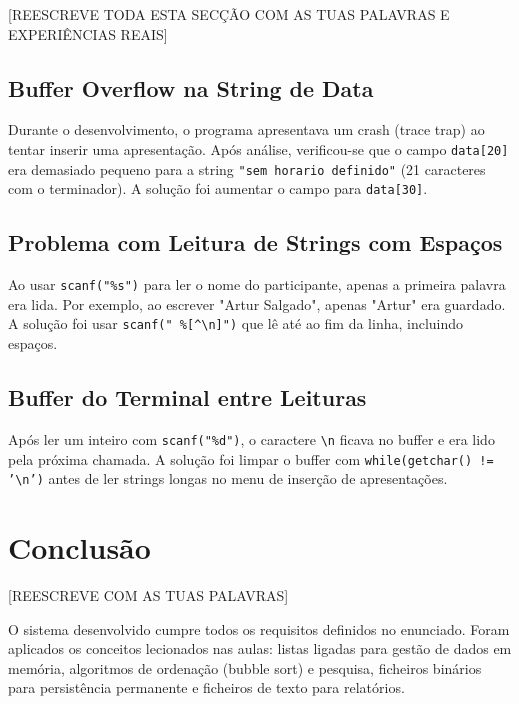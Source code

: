 \documentclass[12pt,a4paper]{article}
\begin{document}
[REESCREVE TODA ESTA SECÇÃO COM AS TUAS PALAVRAS E EXPERIÊNCIAS REAIS]

\subsection{Buffer Overflow na String de Data}

Durante o desenvolvimento, o programa apresentava um crash (trace trap) ao tentar inserir uma apresentação. Após análise, verificou-se que o campo \texttt{data[20]} era demasiado pequeno para a string \texttt{"sem horario definido"} (21 caracteres com o terminador). A solução foi aumentar o campo para \texttt{data[30]}.

\subsection{Problema com Leitura de Strings com Espaços}

Ao usar \texttt{scanf("\%s")} para ler o nome do participante, apenas a primeira palavra era lida. Por exemplo, ao escrever "Artur Salgado", apenas "Artur" era guardado. A solução foi usar \texttt{scanf(" \%[{\textasciicircum}\textbackslash n]")} que lê até ao fim da linha, incluindo espaços.

\subsection{Buffer do Terminal entre Leituras}

Após ler um inteiro com \texttt{scanf("\%d")}, o caractere \texttt{\textbackslash n} ficava no buffer e era lido pela próxima chamada. A solução foi limpar o buffer com \texttt{while(getchar() != '\textbackslash n')} antes de ler strings longas no menu de inserção de apresentações.

\section{Conclusão}

[REESCREVE COM AS TUAS PALAVRAS]

O sistema desenvolvido cumpre todos os requisitos definidos no enunciado. Foram aplicados os conceitos lecionados nas aulas: listas ligadas para gestão de dados em memória, algoritmos de ordenação (bubble sort) e pesquisa, ficheiros binários para persistência permanente e ficheiros de texto para relatórios.
\end{document}
